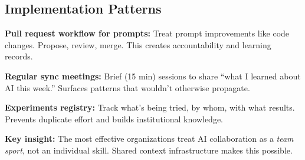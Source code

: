 \subsection{Implementation Patterns}

\textbf{Pull request workflow for prompts:} Treat prompt improvements like code changes. Propose, review, merge. This creates accountability and learning records.

\textbf{Regular sync meetings:} Brief (15 min) sessions to share ``what I learned about AI this week.'' Surfaces patterns that wouldn't otherwise propagate.

\textbf{Experiments registry:} Track what's being tried, by whom, with what results. Prevents duplicate effort and builds institutional knowledge.

\begin{quotebox}
\textbf{Key insight:} The most effective organizations treat AI collaboration as a \emph{team sport}, not an individual skill. Shared context infrastructure makes this possible.
\end{quotebox}

